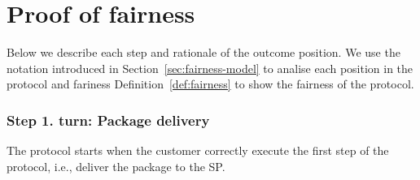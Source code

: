 \documentclass{ieeeaccess}
\newcommand{\customer}{customer}
\renewcommand{\sp}{SP}
\begin{document}
\appendices

\section{Proof of fairness}\label{app:proof-of-fairness}
Below we describe each step and rationale of the outcome position.
We use the notation introduced in Section~\ref{sec:fairness-model} to analise each position in the protocol and fariness Definition~\ref{def:fairness} to show the fairness of the protocol.


\newcommand{\AgreeablePath}{Agreeable path:}
\newcommand{\DisputePath}{The \customer{} starts a dispute:}
\newcommand{\Fairness}{Fairness:}
\newcommand{\CustomerTurn}[0]{\expandafter\MakeUppercase \customer{} turn:}
\newcommand{\SPTurn}[0]{\sp{} turn:}

\newcommand{\CanFollowToOne}[2]{The #1 can follow the protocol to the non-disadvantaged position #2}
\newcommand{\CanDoNothing}[1]{The #1 can do nothing and always ends up in the non-disadvantaged position}
\newcommand{\CanDoAnything}[1]{The #1 can do anything and always ends up in the non-disadvantaged position}
\newcommand{\Pos}[4]{$\operatorname{\sigma_{#1, #2, #3} = #4}$}
\newcommand{\WinForTheSameReason}[1]{The #1 wins the dispute for the same reason}
\newcommand{\LoseForTheSameReason}[1]{The #1 loses the dispute for the same reason}
\newcommand{\ActedAbnormallyThen}[1]{The #1 acted abnormally, then:}
\newcommand{\CustomerPaidButDidntGetResult}{the customer ends up in a disadvantaged position as he paid in advance but didn't receive the result}
\newcommand{\SpReceivedThePayment}{the SP ends up in the advantaged position as she received the payment}


\newcommand{\CustomerLosesBeforePayment}{The customer loses the dispute because the SP is not obligated to do anything until the transaction is paid}
\newcommand{\CustomerLosesBeforePoP}{The customer loses the dispute because the SP still can publish the PoP within the agreed timeframe}


\newcommand{\RemainsIn}[2]{The #1 remains in the #2 position}

\subsubsection*{Step 1. \CustomerTurn{} Package delivery}\label{step-1-deliver-package}

The protocol starts when the customer correctly execute the first step of the protocol, i.e., deliver the package to the SP. 
\end{document}
